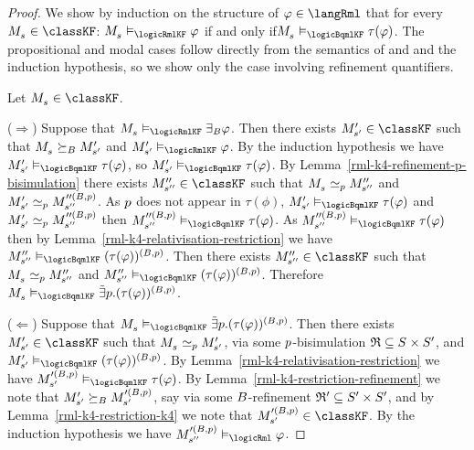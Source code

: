 \begin{proof}
We show by induction on the structure of $\phi \in \langRml$ that for every $\kPModel{\kStateS} \in \classKF$: $\kPModel{\kStateS} \entails_\logicRmlKF \phi$ if and only if$\kPModel{\kStateS} \entails_\logicBqmlKF \tau(\phi)$.
The propositional and modal cases follow directly from the semantics of \logicRmlKF{} and \logicBqmlKF{} and the induction hypothesis, so we show only the case involving refinement quantifiers.

Let $\kPModel{\kStateS} \in \classKF$.

($\Rightarrow$)
Suppose that $\kPModel{\kStateS} \entails_\logicRmlKF \somerefsBs \phi$.
Then there exists $\kPModelP{\kStateSP} \in \classKF$ such that $\kPModel{\kStateS} \simulatesBs \kPModelP{\kStateSP}$ and $\kPModelP{\kStateSP} \entails_\logicRmlKF \phi$.
By the induction hypothesis we have $\kPModelP{\kStateSP} \entails_\logicBqmlKF \tau(\phi)$, so $\kPModelP{\kStateSP} \entails_\logicBqmlKF \tau(\phi)$.
By Lemma~\ref{rml-k4-refinement-p-bisimulation} there exists $\kPModelPP{\kStateSPP} \in \classKF$ such that $\kPModel{\kStateS} \bisimilar[\atomP] \kPModelPP{\kStateSPP}$ and $\kPModelP{\kStateSP} \bisimilar[\atomP] \kPModel[\prime\prime(\agentsB, \atomP)]{\kStateSPP}$.
As $\atomP$ does not appear in $\tau(\phi)$, $\kPModelP{\kStateSP} \entails_\logicBqmlKF \tau(\phi)$ and $\kPModelP{\kStateSP} \bisimilar[\atomP] \kPModel[\prime\prime(\agentsB, \atomP)]{\kStateSPP}$ then $\kPModel[\prime\prime(\agentsB, \atomP)]{\kStateSPP} \entails_\logicBqmlKF \tau(\phi)$.
As $\kPModel[\prime\prime(\agentsB, \atomP)]{\kStateSPP} \entails_\logicBqmlKF \tau(\phi)$ then by Lemma~\ref{rml-k4-relativisation-restriction} we have $\kPModelPP{\kStateSPP} \entails_\logicBqmlKF (\tau(\phi))^{(\agentsB, \atomP)}$.
Then there exists $\kPModelPP{\kStateSPP} \in \classKF$ such that $\kPModel{\kStateS} \bisimilar[\atomP] \kPModelPP{\kStateSPP}$ and $\kPModelPP{\kStateSPP} \entails_\logicBqmlKF (\tau(\phi))^{(\agentsB, \atomP)}$.
Therefore $\kPModel{\kStateS} \entails_\logicBqmlKF \somebisimsP (\tau(\phi))^{(\agentsB, \atomP)}$.

($\Leftarrow$)
Suppose that $\kPModel{\kStateS} \entails_\logicBqmlKF \somebisimsP (\tau(\phi))^{(\agentsB, \atomP)}$.
Then there exists $\kPModelP{\kStateSP} \in \classKF$ such that $\kPModel{\kStateS} \bisimilar[\atomP] \kPModelP{\kStateSP}$, via some $\atomP$-bisimulation $\bisimulation \subseteq \kStates \times \kStatesP$, and $\kPModelP{\kStateSP} \entails_\logicBqmlKF (\tau(\phi))^{(\agentsB, \atomP)}$.
By Lemma~\ref{rml-k4-relativisation-restriction} we have $\kPModel[\prime(\agentsB, \atomP)]{\kStateSP} \entails_\logicBqmlKF \tau(\phi)$.
By Lemma~\ref{rml-k4-restriction-refinement} we note that $\kPModelP{\kStateSP} \simulatesBs \kPModel[\prime(\agentsB, \atomP)]{\kStateSP}$, say via some $\agentsB$-refinement $\refinement' \subseteq \kStatesP \times \kStatesP$, and by Lemma~\ref{rml-k4-restriction-k4} we note that $\kPModel[\prime(\agentsB, \atomP)]{\kStateSP} \in \classKF$.
By the induction hypothesis we have $\kPModel[\prime(\agentsB, \atomP)]{\kStateSPP} \entails_\logicRml \phi$.


\end{proof}

